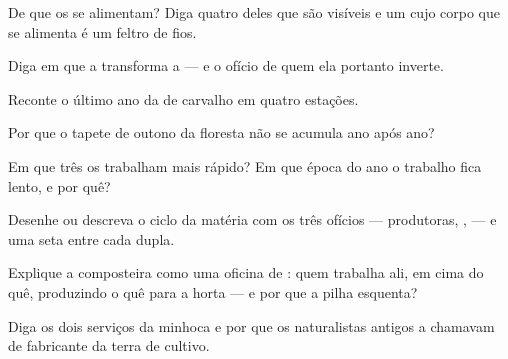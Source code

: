 \begin{exercise}[$\star$]\label{exo:g6:decomposers-and-soil:2}
De que os  se alimentam? Diga quatro deles que são
visíveis e um cujo corpo que se alimenta é um feltro de fios.
\end{exercise}

\begin{exercise}[$\star$]\label{exo:g6:decomposers-and-soil:3}
Diga em que a  transforma a  --- e o
ofício de quem ela portanto inverte.
\end{exercise}

\begin{exercise}[$\star$]\label{exo:g6:decomposers-and-soil:4}
Reconte o último ano da  de carvalho em quatro estações.
\end{exercise}

\begin{exercise}[$\star$]\label{exo:g6:decomposers-and-soil:5}
Por que o tapete de outono da floresta não se acumula ano após ano?
\end{exercise}

\begin{exercise}[$\star$]\label{exo:g6:decomposers-and-soil:6}
Em que três  os  trabalham mais rápido? Em que
época do ano o trabalho fica lento, e por quê?
\end{exercise}

\begin{exercise}[$\star\star$]\label{exo:g6:decomposers-and-soil:7}
Desenhe ou descreva o ciclo da matéria com os três ofícios ---
produtoras, ,  --- e uma seta entre cada
dupla.
\end{exercise}

\begin{exercise}[$\star\star$]\label{exo:g6:decomposers-and-soil:8}
Explique a composteira como uma oficina de : quem
trabalha ali, em cima do quê, produzindo o quê para a horta --- e por
que a pilha esquenta?
\end{exercise}

\begin{exercise}[$\star\star$]\label{exo:g6:decomposers-and-soil:9}
Diga os dois serviços da minhoca e por que os naturalistas antigos a
chamavam de fabricante da terra de cultivo.
\end{exercise}

